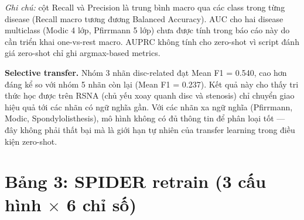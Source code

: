 \documentclass[11pt,a4paper]{article}
\begin{document}
\vspace{0.3em}
\noindent\emph{Ghi chú:} cột Recall và Precision là trung bình macro qua các class trong từng disease (Recall macro tương đương Balanced Accuracy). AUC cho hai disease multiclass (Modic 4 lớp, Pfirrmann 5 lớp) chưa được tính trong báo cáo này do cần triển khai one-vs-rest macro. AUPRC không tính cho zero-shot vì script đánh giá zero-shot chỉ ghi argmax-based metrics.

\vspace{0.5em}
\noindent\textbf{Selective transfer.}
Nhóm 3 nhãn disc-related đạt Mean F1 = 0.540, cao hơn đáng kể so với nhóm 5 nhãn còn lại (Mean F1 = 0.237). Kết quả này cho thấy tri thức học được trên RSNA (chủ yếu xoay quanh disc và stenosis) chỉ chuyển giao hiệu quả tới các nhãn có ngữ nghĩa gần. Với các nhãn xa ngữ nghĩa (Pfirrmann, Modic, Spondylolisthesis), mô hình không có đủ thông tin để phân loại tốt --- đây không phải thất bại mà là giới hạn tự nhiên của transfer learning trong điều kiện zero-shot.

\section*{Bảng 3: SPIDER retrain (3 cấu hình $\times$ 6 chỉ số)}
\end{document}
